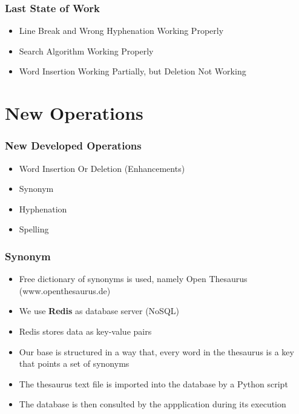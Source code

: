 \documentclass{beamer}
\begin{document}
\begin{frame}
\frametitle{Last State of Work}
\begin{itemize}
\item Line Break and Wrong Hyphenation Working Properly
\item Search Algorithm Working Properly
\item Word Insertion Working Partially, but Deletion Not Working
\end{itemize}
\end{frame}

\section{New Operations}
\begin{frame}
\frametitle{New Developed Operations}
\begin{itemize}
	\item Word Insertion Or Deletion (Enhancements)
	\item Synonym
	\item Hyphenation
	\item Spelling
\end{itemize}
\end{frame}

\begin{frame}
\frametitle{Synonym}
\begin{itemize}
	\item Free dictionary of synonyms is used, namely Open Thesaurus (www.openthesaurus.de)
	\item We use \textbf{Redis} as database server (NoSQL)
	\item Redis stores data as key-value pairs
	\item Our base is structured in a way that, every word in the thesaurus is a key that points a set of synonyms
	\item The thesaurus text file is imported into the database by a Python script
	\item The database is then consulted by the appplication during its execution
\end{itemize}
\end{frame}
\end{document}
